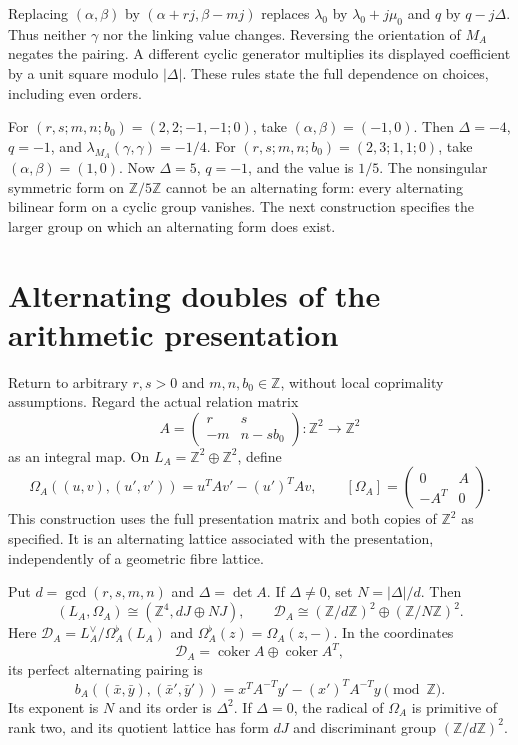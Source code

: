 Replacing $(\alpha,\beta)$ by $(\alpha+rj,\beta-mj)$ replaces
$\lambda_0$ by $\lambda_0+j\mu_0$ and $q$ by $q-j\Delta$.
Thus neither $\gamma$ nor the linking value changes.
Reversing the orientation of $M_A$ negates the pairing.
A different cyclic generator multiplies its displayed coefficient by a
unit square modulo $|\Delta|$.
These rules state the full dependence on choices, including even orders.

For $(r,s;m,n;b_0)=(2,2;-1,-1;0)$, take
$(\alpha,\beta)=(-1,0)$.  Then $\Delta=-4$, $q=-1$, and
$\lambda_{M_A}(\gamma,\gamma)=-1/4$.
For $(r,s;m,n;b_0)=(2,3;1,1;0)$, take $(\alpha,\beta)=(1,0)$.
Now $\Delta=5$, $q=-1$, and the value is $1/5$.
The nonsingular symmetric form on $\mathbb Z/5\mathbb Z$ cannot
be an alternating form: every alternating bilinear form on a cyclic
group vanishes.  The next construction specifies the larger group
on which an alternating form does exist.

\section{Alternating doubles of the arithmetic presentation}

Return to arbitrary $r,s>0$ and $m,n,b_0\in\mathbb Z$, without
local coprimality assumptions.  Regard the actual relation matrix
\[
 A=\begin{pmatrix}r&s\\-m&n-sb_0\end{pmatrix}:\mathbb Z^2\to\mathbb Z^2
\]
as an integral map.  On $L_A=\mathbb Z^2\oplus\mathbb Z^2$, define
\begin{equation}\label{eq:doubled-form}
 \Omega_A((u,v),(u',v'))=u^TAv'-(u')^TAv,\qquad
 [\Omega_A]=\begin{pmatrix}0&A\\-A^T&0\end{pmatrix}.
\end{equation}
This construction uses the full presentation matrix and both copies of
$\mathbb Z^2$ as specified.  It is an alternating lattice associated
with the presentation, independently of a geometric fibre lattice.

\begin{theorem}\label{thm:double}
Put $d=\gcd(r,s,m,n)$ and $\Delta=\det A$.
If $\Delta\ne0$, set $N=|\Delta|/d$.  Then
\[
 (L_A,\Omega_A)\cong (\mathbb Z^4,dJ\oplus NJ),\qquad
 \mathcal D_A\cong(\mathbb Z/d\mathbb Z)^2
                    \oplus(\mathbb Z/N\mathbb Z)^2.
\]
Here $\mathcal D_A=L_A^\vee/\Omega_A^\flat(L_A)$ and
$\Omega_A^\flat(z)=\Omega_A(z,-)$.  In the coordinates
\[
 \mathcal D_A=\operatorname{coker}A\oplus\operatorname{coker}A^T,
\]
its perfect alternating pairing is
\begin{equation}\label{eq:arithmetic-pairing}
 b_A((\bar x,\bar y),(\bar x',\bar y'))
     =x^TA^{-T}y'-(x')^TA^{-T}y\pmod{\mathbb Z}.
\end{equation}
Its exponent is $N$ and its order is $\Delta^2$.
If $\Delta=0$, the radical of $\Omega_A$ is primitive of rank two,
and its quotient lattice has form $dJ$ and discriminant group
$(\mathbb Z/d\mathbb Z)^2$.
\end{theorem}

